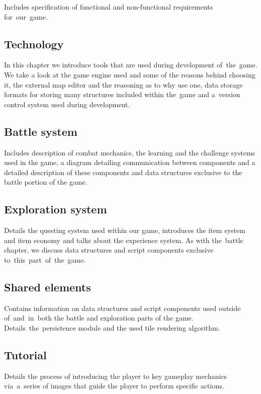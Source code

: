 \documentclass[thesis=B,english,hidelinks]{FITthesisXE}[2012/06/26]
\begin{document}
\begin{introduction}
Includes specification of functional and non-functional requirements for~our~game.

\subsection{Technology}

In this chapter we introduce tools that are used during development of~the~game. We take a look at the game engine used and some of the reasons behind choosing it, the external map editor and the reasoning as to why use one, data storage formats for storing many structures included within the~game and a~version control system used during development.

\subsection{Battle system}

Includes description of combat mechanics, the learning and the challenge systems used in the game, a diagram detailing communication between components and a detailed description of these components and data structures exclusive to the battle portion of the game.

\subsection{Exploration system}

Details the questing system used within our game, introduces the item system and item economy and talks about the experience system. As with the~battle chapter, we discuss data structures and script components exclusive to~this~part~of~the~game.

\subsection{Shared elements}

Contains information on data structures and script components used outside of~and~in~both the battle and exploration parts of the game. Details~the~persistence module and the used tile rendering algorithm.

\subsection{Tutorial}

Details the process of introducing the player to key gameplay mechanics via~a~series of images that guide the player to perform specific actions.


\end{introduction}
\end{document}
